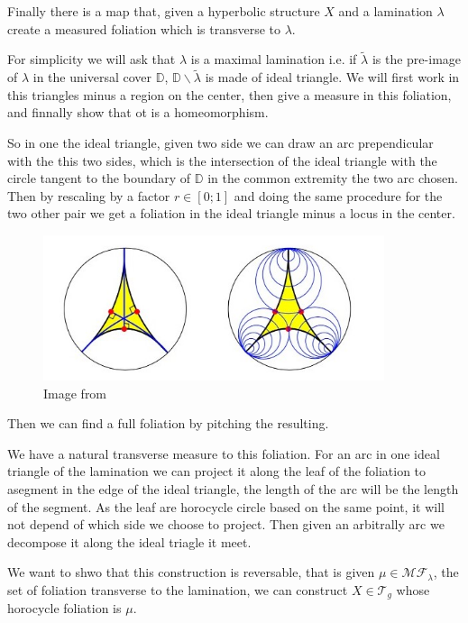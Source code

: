 Finally there is a map that, given a hyperbolic structure $X$ and a lamination $\lambda$ create a measured foliation which is transverse to $\lambda$.

For simplicity we will ask that $\lambda$ is a maximal lamination i.e. if $\tilde{\lambda}$ is the pre-image of $\lambda$ in the universal cover $\mathbb{D}$, $\mathbb{D}\backslash \tilde{\lambda}$ is made of ideal triangle. We will first work in this triangles minus a region on the center, then give a measure in this foliation, and finnally show that ot is a homeomorphism.

So in one the ideal triangle, given two side we can draw an arc prependicular with the this two sides, which is the intersection of the ideal triangle with the circle tangent to the boundary of $\mathbb{D}$ in the common extremity the two arc chosen. Then by rescaling by a factor $r \in [0;1]$ and doing the same procedure for the two other pair we get a foliation in the ideal triangle minus a locus in the center.


\begin{figure}[h!]
\centering
\includegraphics[width=10cm]{Image/FoliationTri.jpg}
\caption{Image from \cite{Martelli2016AnIT}}
\end{figure}

Then we can find a full foliation by pitching the resulting.

We have a natural transverse measure to this foliation. For an arc in one ideal triangle of the lamination we can project it along the leaf of the foliation to asegment in the edge of the ideal triangle, the length of the arc will be the length of the segment. As the leaf are horocycle circle based on the same point, it will not depend of which side we choose to project. Then given an arbitrally arc we decompose it along the ideal triagle it meet.

We want to shwo that this construction is reversable, that is given $\mu \in \mathcal{MF}_\lambda $, the set of foliation transverse to the lamination, we can
construct $X \in \mathcal{T}_g$ whose horocycle foliation is $\mu$.

